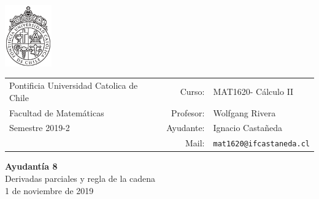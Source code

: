 \documentclass[12pt]{article}
\makeatletter
\newcommand{\ayudantia}{{\sc Ayudantía 8}}
\newcommand{\tituloayu}{Derivadas parciales y regla de la cadena}
\newcommand{\fecha}{1 de noviembre de 2019}
\newcommand{\sigla}{MAT1620}
\newcommand{\nombre}{Cálculo II}
\newcommand{\profesor}{Wolfgang Rivera}
\newcommand{\ano}{2019}
\newcommand{\semestre}{2}
\newcommand{\mail}{mat1620@ifcastaneda.cl}
\makeatother
\begin{document}
\thispagestyle{empty}

\begin{minipage}{2cm}
	\includegraphics[width=2cm]{../../../../img/logo.pdf}
	\vspace{0.5cm}
\end{minipage}
\begin{minipage}{\linewidth}
	\begin{tabular}{lrl}
		{\scriptsize\sc Pontificia Universidad Catolica de Chile} & \hspace*{0.7in}Curso: &
		\sigla  - \nombre\\
		{\sc Facultad de Matemáticas}&
		Profesor: & \profesor \\
		{\sc Semestre \ano-\semestre} & Ayudante: & {Ignacio Castañeda}\\
		& {Mail:} & \texttt{\mail}
	\end{tabular}
\end{minipage}

\vspace{-10mm}
\begin{center}
	{\LARGE\bf \ayudantia}\\
	\vspace{0.1cm}
	{\tituloayu}\\
	\vspace{0.1cm}
	\fecha\\
	\vspace{0.4cm}
\end{center}
\end{document}
